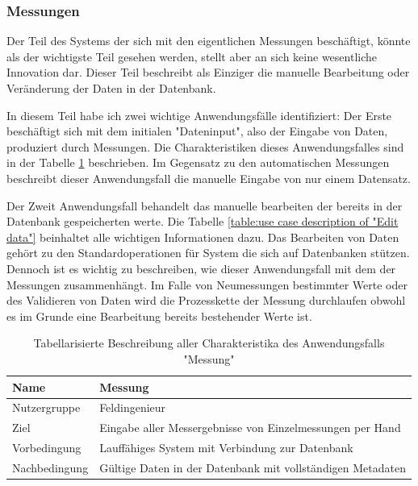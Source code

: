 \subsubsection{Messungen}
Der Teil des Systems der sich mit den eigentlichen Messungen beschäftigt, könnte als der wichtigste Teil gesehen werden, stellt aber an sich keine wesentliche Innovation dar. Dieser Teil beschreibt als Einziger die manuelle Bearbeitung oder Veränderung der Daten in der Datenbank.

In diesem Teil habe ich zwei wichtige Anwendungsfälle identifiziert: Der Erste beschäftigt sich mit dem initialen "Dateninput", also der Eingabe von Daten, produziert durch Messungen. Die Charakteristiken dieses Anwendungsfalles sind in der Tabelle \ref{table:use case description of "Measure data"} beschrieben. Im Gegensatz zu den automatischen Messungen beschreibt dieser Anwendungsfall die manuelle Eingabe von nur einem Datensatz.

Der Zweit Anwendungsfall behandelt das manuelle bearbeiten der bereits in der Datenbank gespeicherten werte. Die Tabelle \ref{table:use case description of "Edit data"} beinhaltet alle wichtigen Informationen dazu. Das Bearbeiten von Daten gehört zu den Standardoperationen für System die sich auf Datenbanken stützen. Dennoch ist es wichtig zu beschreiben, wie dieser Anwendungsfall mit dem der Messungen zusammenhängt. Im Falle von Neumessungen bestimmter Werte oder des Validieren von Daten wird die Prozesskette der Messung durchlaufen obwohl es im Grunde eine Bearbeitung bereits bestehender Werte ist.

\begin{table}[H]
\centering
\begin{tabular}{l | p{11cm}}
Name & Messung\\ \hline 
Nutzergruppe & Feldingenieur\\ \hline 
Ziel & Eingabe aller Messergebnisse von Einzelmessungen per Hand\\ \hline 
Vorbedingung & Lauffähiges System mit Verbindung zur Datenbank\\ \hline 
Nachbedingung & Gültige Daten in der Datenbank mit vollständigen Metadaten\\ 
\end{tabular}
\caption{Tabellarisierte Beschreibung aller Charakteristika des Anwendungsfalls "Messung"} 
\label{table:use case description of "Measure data"}
\end{table}

